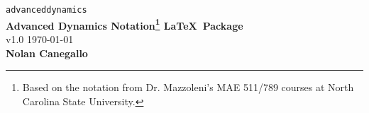 \begin{titlepage}
    \begin{center}
        \vspace*{2in}
        \Huge
        \texttt{advanceddynamics} \\
        \textbf{Advanced Dynamics Notation\footnote{Based on the notation from Dr. Mazzoleni's MAE 511/789 courses at North Carolina State University.} \linebreak \LaTeX\ Package} \\
        \vspace{12pt}
        \large
        v1.0 \today \\
        \vspace{24pt}
        \Large
        \textbf{Nolan Canegallo} \\
        \vfill
    \end{center}
\end{titlepage}